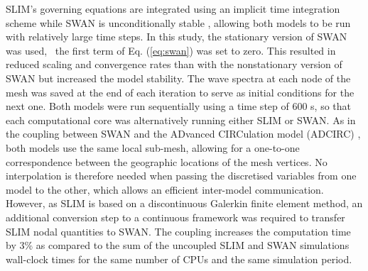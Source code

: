 SLIM's governing equations are integrated using an implicit time integration scheme while SWAN is unconditionally stable \citep{dietrich2012performance}, allowing both models to be run with relatively large time steps. In this study, the stationary version of SWAN was used, \ie~the first term of Eq. (\ref{eq:swan}) was set to zero. This resulted in reduced scaling and convergence rates than with the nonstationary version of SWAN but increased the model stability. The wave spectra at each node of the mesh was saved at the end of each iteration to serve as initial conditions for the next one. Both models were run sequentially using a time step of 600 s, so that each computational core was alternatively running either SLIM or SWAN. As in the coupling between SWAN and the ADvanced CIRCulation model (ADCIRC) \citep{dietrich2012performance}, both models use the same local sub-mesh, allowing for a one-to-one correspondence between the geographic locations of the mesh vertices. No interpolation is therefore needed when passing the discretised variables from one model to the other, which allows an efficient inter-model communication. However, as SLIM is based on  a discontinuous Galerkin finite element method, an additional conversion step to a continuous framework was required to transfer SLIM nodal quantities to SWAN. The coupling increases the computation time by 3\% as compared to the sum of the uncoupled SLIM and SWAN simulations wall-clock times for the same number of CPUs and the same simulation period.


